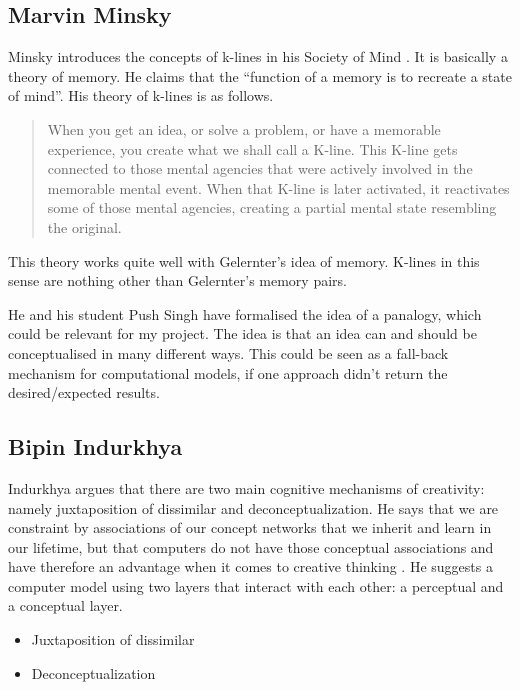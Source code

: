 \subsection{Marvin Minsky}

Minsky introduces the concepts of k-lines in his Society of Mind \citep{Minsky1980, Minsky1988}. It is basically a theory of memory. He claims that the ``function of a memory is to recreate a state of mind''. His theory of k-lines is as follows.

\begin{quote}
  When you get an idea, or solve a problem, or have a memorable experience, you create what we shall call a K-line. This K-line gets connected to those mental agencies that were actively involved in the memorable mental event. When that K-line is later activated, it reactivates some of those mental agencies, creating a partial mental state resembling the original. \citep{Minsky1980, Minsky1988}
\end{quote}

This theory works quite well with Gelernter's idea of memory. K-lines in this sense are nothing other than Gelernter's memory pairs.

He and his student Push Singh have formalised the idea of a panalogy, which could be relevant for my project. The idea is that an idea can and should be conceptualised in many different ways. This could be seen as a fall-back mechanism for computational models, if one approach didn't return the desired/expected results.

\subsection{Bipin Indurkhya}

Indurkhya argues that there are two main cognitive mechanisms of creativity: namely juxtaposition of dissimilar and deconceptualization. He says that we are constraint by associations of our concept networks that we inherit and learn in our lifetime, but that computers do not have those conceptual associations and have therefore an advantage when it comes to creative thinking \citep{Indurkhya}. He suggests a computer model using two layers that interact with each other: a perceptual and a conceptual layer.

\begin{itemize}
  \item Juxtaposition of dissimilar
  \item Deconceptualization
\end{itemize}


